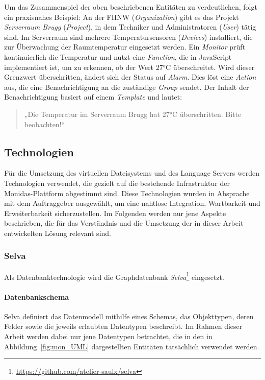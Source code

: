 Um das Zusammenspiel der oben beschriebenen Entitäten zu verdeutlichen, folgt ein praxisnahes Beispiel:  
An der FHNW (\textit{Organization}) gibt es das Projekt \textit{Serverraum Brugg} (\textit{Project}), in dem Techniker und Administratoren (\textit{User}) tätig sind. Im Serverraum sind mehrere Temperatursensoren (\textit{Devices}) installiert, die zur Überwachung der Raumtemperatur eingesetzt werden. Ein \textit{Monitor} prüft kontinuierlich die Temperatur und nutzt eine \textit{Function}, die in JavaScript implementiert ist, um zu erkennen, ob der Wert 27°C überschreitet.  
Wird dieser Grenzwert überschritten, ändert sich der Status auf \textit{Alarm}. Dies löst eine \textit{Action} aus, die eine Benachrichtigung an die zuständige \textit{Group} sendet. Der Inhalt der Benachrichtigung basiert auf einem \textit{Template} und lautet:

\begin{quote}
  „Die Temperatur im Serverraum Brugg hat 27°C überschritten. Bitte beobachten!“
\end{quote}


\subsection{Technologien}
\label{mon:tech}
Für die Umsetzung des virtuellen Dateisystems und des Language Servers werden Technologien verwendet, die gezielt auf die bestehende Infrastruktur der Monidas-Plattform abgestimmt sind. Diese Technologien wurden in Absprache mit dem Auftraggeber ausgewählt, um eine nahtlose Integration, Wartbarkeit und Erweiterbarkeit sicherzustellen. Im Folgenden werden nur jene Aspekte beschrieben, die für das Verständnis und die Umsetzung der in dieser Arbeit entwickelten Lösung relevant sind.

\subsubsection*{Selva}

Als Datenbanktechnologie wird die Graphdatenbank \textit{Selva}\footnote{\url{https://github.com/atelier-saulx/selva}} eingesetzt.

\paragraph{Datenbankschema}
Selva definiert das Datenmodell mithilfe eines Schemas, das Objekttypen, deren Felder sowie die jeweils erlaubten Datentypen beschreibt. Im Rahmen dieser Arbeit werden dabei nur jene Datentypen betrachtet, die in den in Abbildung~\ref{fig:mon_UML} dargestellten Entitäten tatsächlich verwendet werden.

